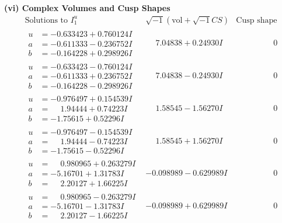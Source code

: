 \documentclass[1p]{elsarticle_modified}
\theoremstyle{definition}
\newcommand{\I}{\sqrt{-1}}
\begin{document}
\newpage\flushleft \textbf{(vi) Complex Volumes and Cusp Shapes}
$$\begin{array}{c|c|c}  
\text{Solutions to }I^u_{1}& \I (\text{vol} + \sqrt{-1}CS) & \text{Cusp shape}\\
 \hline 
\begin{aligned}
u &= -0.633423 + 0.760124 I \\
a &= -0.611333 - 0.236752 I \\
b &= -0.164228 + 0.298926 I\end{aligned}
 & \phantom{-}7.04838 + 0.24930 I & \phantom{-0.000000 } 0 \\ \hline\begin{aligned}
u &= -0.633423 - 0.760124 I \\
a &= -0.611333 + 0.236752 I \\
b &= -0.164228 - 0.298926 I\end{aligned}
 & \phantom{-}7.04838 - 0.24930 I & \phantom{-0.000000 } 0 \\ \hline\begin{aligned}
u &= -0.976497 + 0.154539 I \\
a &= \phantom{-}1.94444 + 0.74223 I \\
b &= -1.75615 + 0.52296 I\end{aligned}
 & \phantom{-}1.58545 - 1.56270 I & \phantom{-0.000000 } 0 \\ \hline\begin{aligned}
u &= -0.976497 - 0.154539 I \\
a &= \phantom{-}1.94444 - 0.74223 I \\
b &= -1.75615 - 0.52296 I\end{aligned}
 & \phantom{-}1.58545 + 1.56270 I & \phantom{-0.000000 } 0 \\ \hline\begin{aligned}
u &= \phantom{-}0.980965 + 0.263279 I \\
a &= -5.16701 + 1.31783 I \\
b &= \phantom{-}2.20127 + 1.66225 I\end{aligned}
 & -0.098989 - 0.629989 I & \phantom{-0.000000 } 0 \\ \hline\begin{aligned}
u &= \phantom{-}0.980965 - 0.263279 I \\
a &= -5.16701 - 1.31783 I \\
b &= \phantom{-}2.20127 - 1.66225 I\end{aligned}
 & -0.098989 + 0.629989 I & \phantom{-0.000000 } 0 \\ \hline\begin{aligned}

\end{aligned}
\end{array}$$
\end{document}
